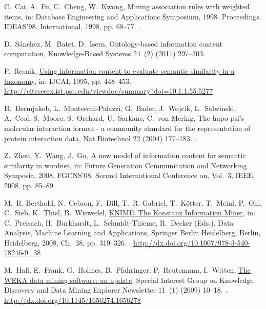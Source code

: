\documentclass{article}
\theoremstyle{definition}
\begin{document}
\begin{thebibliography}{10}
C.~Cai, A.~Fu, C.~Cheng, W.~Kwong, Mining association rules with weighted
  items, in: Database Engineering and Applications Symposium, 1998.
  Proceedings. IDEAS'98. International, 1998, pp. 68--77.
\newblock \href {http://dx.doi.org/10.1109/IDEAS.1998.694360}
  {}.

D.~S{\'a}nchez, M.~Batet, D.~Isern, Ontology-based information content
  computation, Knowledge-Based Systems 24~(2) (2011) 297--303.

P.~Resnik,
  \href{http://citeseerx.ist.psu.edu/viewdoc/summary?doi=10.1.1.55.5277}{Using
  information content to evaluate semantic similarity in a taxonomy}, in:
  IJCAI, 1995, pp. 448--453.
\newline\urlprefix\url{http://citeseerx.ist.psu.edu/viewdoc/summary?doi=10.1.1.55.5277}

H.~Hermjakob, L.~Montecchi-Palazzi, G.~Bader, J.~Wojcik, L.~Salwinski, A.~Ceol,
  S.~Moore, S.~Orchard, U.~Sarkans, C.~von Mering, The hupo psi's molecular
  interaction format - a community standard for the representation of protein
  interaction data, Nat Biotechnol 22 (2004) 177--183.
\newblock \href {http://dx.doi.org/10.1038/nbt926} {}.

Z.~Zhou, Y.~Wang, J.~Gu, A new model of information content for semantic
  similarity in wordnet, in: Future Generation Communication and Networking
  Symposia, 2008. FGCNS'08. Second International Conference on, Vol.~3, IEEE,
  2008, pp. 85--89.

M.~R. Berthold, N.~Cebron, F.~Dill, T.~R. Gabriel, T.~K\"{o}tter, T.~Meinl,
  P.~Ohl, C.~Sieb, K.~Thiel, B.~Wiswedel,
  \href{http://dx.doi.org/10.1007/978-3-540-78246-9\_38}{{KNIME: The Konstanz
  Information Miner}}, in: C.~Preisach, H.~Burkhardt, L.~Schmidt-Thieme,
  R.~Decker (Eds.), Data Analysis, Machine Learning and Applications, Springer
  Berlin Heidelberg, Berlin, Heidelberg, 2008, Ch.~38, pp. 319--326.
\newblock \href {http://dx.doi.org/10.1007/978-3-540-78246-9\_38}
  {}.
\newline\urlprefix\url{http://dx.doi.org/10.1007/978-3-540-78246-9\_38}

M.~Hall, E.~Frank, G.~Holmes, B.~Pfahringer, P.~Reutemann, I.~Witten,
  \href{http://dx.doi.org/10.1145/1656274.1656278}{{The WEKA data mining
  software: an update}}, Special Interest Group on Knowledge Discovery and Data
  Mining Explorer Newsletter 11~(1) (2009) 10--18.
\newblock \href {http://dx.doi.org/10.1145/1656274.1656278}
  {}.
\newline\urlprefix\url{http://dx.doi.org/10.1145/1656274.1656278}


\end{thebibliography}
\end{document}
